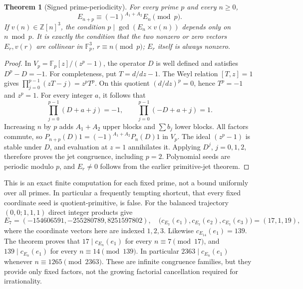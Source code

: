 \documentclass[11pt,a4paper]{article}
\newtheorem{theorem}{Theorem}[section]
\theoremstyle{definition}
\theoremstyle{remark}
\numberwithin{equation}{section}
\begin{document}
\begin{theorem}[Signed prime-periodicity]
\label{p6:thm:seed-period}
For every prime $p$ and every $n\ge0$,
\[
 E_{n+p}\equiv(-1)^{A_1+A_2}E_n\pmod p.
\]
If $v(n)\in\mathbb Z[n]^3$, the condition
$p\mid\gcd(E_n\times v(n))$ depends only on $n\bmod p$.
It is exactly the condition that the two nonzero or zero vectors
$E_r,v(r)$ are collinear in $\mathbb F_p^3$, $r\equiv n\pmod p$;
$E_r$ itself is always nonzero.
\end{theorem}
\begin{proof}
In $V_p=\mathbb F_p[z]/(z^p-1)$, the operator $D$ is well defined and
satisfies $D^p-D=-1$. For completeness, put $T=d/dz-1$. The Weyl relation
$[T,z]=1$ gives $\prod_{j=0}^{p-1}(zT-j)=z^pT^p$.
On this quotient $(d/dz)^p=0$, hence $T^p=-1$ and $z^p=1$.
For every integer $a$, it follows that
\[
 \prod_{j=0}^{p-1}(D+a+j)=-1,\qquad
 \prod_{j=0}^{p-1}(-D+a+j)=1.
\]
Increasing $n$ by $p$ adds $A_1+A_2$ upper blocks and $\sum b_j$ lower
blocks. All factors commute, so
$P_{n+p}(D)1=(-1)^{A_1+A_2}P_n(D)1$ in $V_p$.
The ideal $(z^p-1)$ is stable under $D$, and evaluation at $z=1$
annihilates it. Applying $D^j$, $j=0,1,2$, therefore proves the jet
congruence, including $p=2$. Polynomial seeds are periodic modulo $p$,
and $E_r\ne0$ follows from the earlier primitive-jet theorem.
\end{proof}

This is an exact finite computation for each fixed prime, not a bound
uniformly over all primes. In particular a frequently tempting shortcut,
that every fixed coordinate seed is quotient-primitive, is false.
For the balanced trajectory $(0,0;1,1,1)$ direct integer products give
\[
 E_7=(-154606591,-255280789,8251597802),
 \quad
 \bigl(c_{E_7}(e_1),c_{E_7}(e_2),c_{E_7}(e_3)\bigr)=(17,1,19),
\]
where the coordinate vectors here are indexed $1,2,3$.
Likewise $c_{E_{14}}(e_1)=139$.
The theorem proves that $17\mid c_{E_n}(e_1)$ for every $n\equiv7\pmod{17}$,
and $139\mid c_{E_n}(e_1)$ for every $n\equiv14\pmod{139}$.
In particular $2363\mid c_{E_n}(e_1)$ whenever $n\equiv1265\pmod{2363}$.
These are infinite congruence families, but they provide only fixed
factors, not the growing factorial cancellation required for irrationality.
\end{document}

